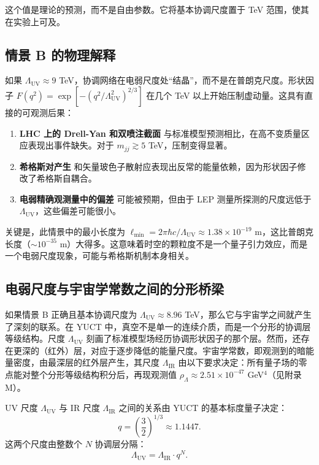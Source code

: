 \documentclass[11pt,a4paper]{article}
\newcommand{\Lmin}{\ell_{\min}}
\newcommand{\LUV}{\Lambda_{\mathrm{UV}}}
\theoremstyle{remark}
\begin{document}
	这个值是理论的预测，而不是自由参数。它将基本协调尺度置于 TeV 范围，使其在实验上可及。
	
	\subsection{情景 B 的物理解释}
	
	如果 \(\LUV \approx 9\) TeV，协调网络在电弱尺度处“结晶”，而不是在普朗克尺度。形状因子 \(F(q^2) = \exp[-(q^2/\LUV^2)^{2/3}]\) 在几个 TeV 以上开始压制虚动量。这具有直接的可观测后果：
	
	\begin{enumerate}[label=(\arabic*)]
		\item \textbf{LHC 上的 Drell-Yan 和双喷注截面} 与标准模型预测相比，在高不变质量区应表现出事件缺失。对于 \(m_{jj} \gtrsim 5\) TeV，压制变得显著。
		\item \textbf{希格斯对产生} 和矢量玻色子散射应表现出反常的能量依赖，因为形状因子修改了希格斯自耦合。
		\item \textbf{电弱精确观测量中的偏差} 可能被预期，但由于 LEP 测量所探测的尺度远低于 \(\LUV\)，这些偏差可能很小。
	\end{enumerate}
	
	关键是，此情景中的最小长度为 \(\Lmin = 2\pi\hbar c/\LUV \approx 1.38\times 10^{-19}\) m，这比普朗克长度（\(\sim 10^{-35}\) m）大得多。这意味着时空的颗粒度不是一个量子引力效应，而是一个电弱尺度现象，可能与希格斯机制本身相关。
	
	\subsection{电弱尺度与宇宙学常数之间的分形桥梁}
	\label{subsec:bridge}
	
	如果情景 B 正确且基本协调尺度为 \(\LUV \approx 8.96\) TeV，那么它与宇宙学之间就产生了深刻的联系。在 YUCT 中，真空不是单一的连续介质，而是一个分形的协调层等级结构。尺度 \(\LUV\) 刻画了标准模型场经历协调形状因子的那个层。然而，还存在更深的（红外）层，对应于逐步降低的能量尺度。宇宙学常数，即观测到的暗能量密度，由最深层的红外层产生，其尺度 \(\Lambda_{\mathrm{IR}}\) 由以下要求决定：所有量子场的零点能对整个分形等级结构积分后，再现观测值 \(\rho_{\Lambda} \approx 2.51 \times 10^{-47}\) GeV\(^4\)（见附录 M）。
	
	UV 尺度 \(\LUV\) 与 IR 尺度 \(\Lambda_{\mathrm{IR}}\) 之间的关系由 YUCT 的基本标度量子决定：
	\begin{equation}
		q = \left(\frac{3}{2}\right)^{1/3} \approx 1.1447.
	\end{equation}
	这两个尺度由整数个 \(N\) 协调层分隔：
	\begin{equation}
		\LUV = \Lambda_{\mathrm{IR}} \cdot q^{N}.
		\label{eq:bridge}
	\end{equation}
	
\end{document}
